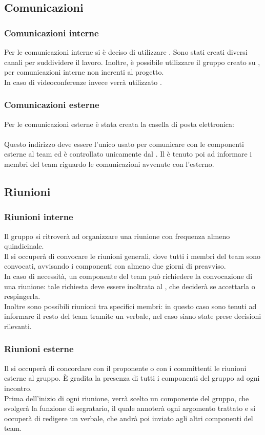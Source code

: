 \subsection{Comunicazioni}
	\subsubsection{Comunicazioni interne}
	Per le comunicazioni interne si è deciso di utilizzare . Sono stati creati diversi canali per suddividere il lavoro.
	Inoltre, è possibile utilizzare il gruppo creato su , per comunicazioni interne non inerenti al progetto. \\
	In caso di videoconferenze invece verrà utilizzato .
	\subsubsection{Comunicazioni esterne}
	Per le comunicazioni esterne è stata creata la casella di posta elettronica: \\
	 \\
	Questo indirizzo deve essere l'unico usato per comunicare con le componenti esterne al team ed è controllato unicamente dal \gl{\RES}. Il \RES è tenuto poi ad informare i membri del team riguardo le comunicazioni avvenute con l'esterno.
\subsection{Riunioni}
	\subsubsection{Riunioni interne}
	Il gruppo si ritroverà ad organizzare una riunione con frequenza almeno quindicinale. \\
	Il \RES si occuperà di convocare le riunioni generali, dove tutti i membri del team sono convocati, avvisando i componenti con almeno due giorni di preavviso. \\
	In caso di necessità, un componente del team può richiedere la convocazione di una riunione: tale richiesta deve essere inoltrata al \RES, che deciderà se accettarla o respingerla. \\
	Inoltre sono possibili riunioni tra specifici membri: in questo caso sono tenuti ad informare il resto del team tramite un verbale, nel caso siano state prese decisioni rilevanti. \\
	\subsubsection{Riunioni esterne}
	Il \RES si occuperà di concordare con il proponente o con i committenti le riunioni esterne al gruppo. È gradita la presenza di tutti i componenti del gruppo ad ogni incontro. \\
	Prima dell'inizio di ogni riunione, verrà scelto un componente del gruppo, che svolgerà la funzione di segratario, il quale annoterà ogni argomento trattato e si occuperà di redigere un verbale, che andrà poi inviato agli altri componenti del team.